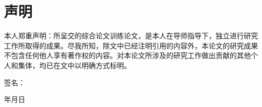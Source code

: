\cleardoublepage
\chapter*{声明}

\noindent 本人郑重声明：所呈交的综合论文训练论文，是本人在导师指导下，独立进行研究工作所取得的成果。尽我所知，除文中已经注明引用的内容外，本论文的研究成果不包含任何他人享有著作权的内容。对本论文所涉及的研究工作做出贡献的其他个人和集体，均已在文中以明确方式标明。

\vspace{3cm}

\begin{flushright}
  签\quad 名：\hspace{4cm}

  \vspace{1.2cm}

  年\quad 月\quad 日
\end{flushright}

